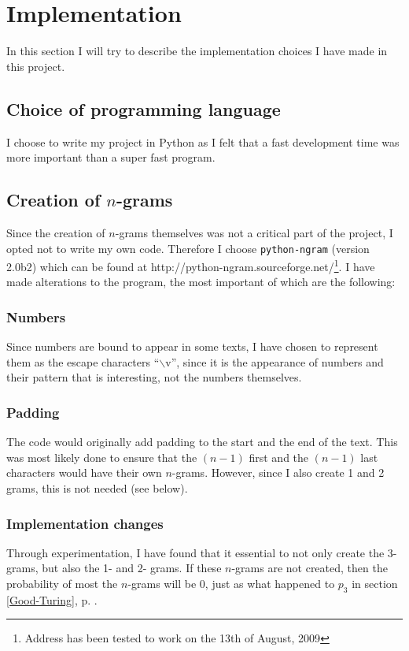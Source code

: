 \section{Implementation}
\label{implementation}

In this section I will try to describe the implementation choices I have made in this project.

\subsection{Choice of programming language}
I choose to write my project in Python as I felt that a fast development time was more important than a super fast program.

\subsection{Creation of $n$-grams}
Since the creation of $n$-grams themselves was not a critical part of the project, I opted not to write my own code. Therefore I choose \texttt{python-ngram} (version 2.0b2) which can be found at http://python-ngram.sourceforge.net/\footnote{Address has been tested to work on the 13th of August, 2009}. I have made alterations to the program, the most important of which are the following:

\subsubsection*{Numbers}
Since numbers are bound to appear in some texts, I have chosen to represent them as the escape characters ``$\backslash$v'', since it is the appearance of numbers and their pattern that is interesting, not the numbers themselves.

\subsubsection*{Padding}
The code would originally add padding to the start and the end of the text. This was most likely done to ensure that the $(n-1)$ first and the $(n-1)$ last characters would have their own $n$-grams. However, since I also create 1 and 2 grams, this is not needed (see below).

\subsubsection*{Implementation changes}
Through experimentation, I have found that it essential to not only create the 3-grams, but also the 1- and 2- grams. If these $n$-grams are not created, then the probability of most the $n$-grams will be 0, just as what happened to $p_3$ in section \ref{Good-Turing}, p. \pageref{Good-Turing}.

